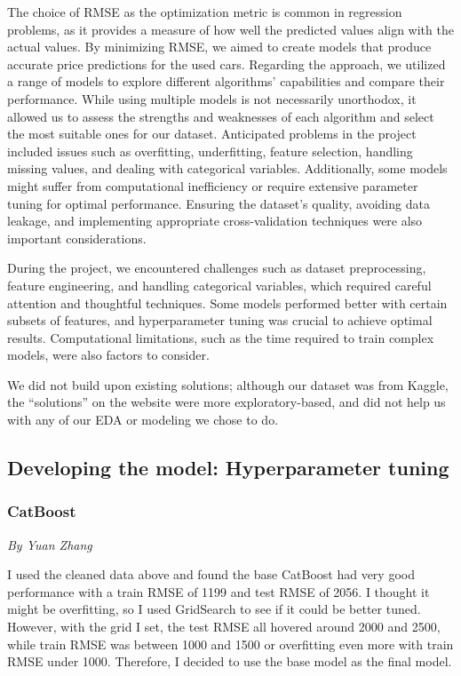 \documentclass[
  letterpaper,
  DIV=11,
  numbers=noendperiod]{scrartcl}
\begin{document}
The choice of RMSE as the optimization metric is common in regression
problems, as it provides a measure of how well the predicted values
align with the actual values. By minimizing RMSE, we aimed to create
models that produce accurate price predictions for the used cars.
Regarding the approach, we utilized a range of models to explore
different algorithms' capabilities and compare their performance. While
using multiple models is not necessarily unorthodox, it allowed us to
assess the strengths and weaknesses of each algorithm and select the
most suitable ones for our dataset. Anticipated problems in the project
included issues such as overfitting, underfitting, feature selection,
handling missing values, and dealing with categorical variables.
Additionally, some models might suffer from computational inefficiency
or require extensive parameter tuning for optimal performance. Ensuring
the dataset's quality, avoiding data leakage, and implementing
appropriate cross-validation techniques were also important
considerations.

During the project, we encountered challenges such as dataset
preprocessing, feature engineering, and handling categorical variables,
which required careful attention and thoughtful techniques. Some models
performed better with certain subsets of features, and hyperparameter
tuning was crucial to achieve optimal results. Computational
limitations, such as the time required to train complex models, were
also factors to consider.

We did not build upon existing solutions; although our dataset was from
Kaggle, the ``solutions'' on the website were more exploratory-based,
and did not help us with any of our EDA or modeling we chose to do.

\hypertarget{developing-the-model-hyperparameter-tuning}{%
\subsection{Developing the model: Hyperparameter
tuning}\label{developing-the-model-hyperparameter-tuning}}

\hypertarget{catboost}{%
\subsubsection{CatBoost}\label{catboost}}

\emph{By Yuan Zhang}

I used the cleaned data above and found the base CatBoost had very good
performance with a train RMSE of 1199 and test RMSE of 2056. I thought
it might be overfitting, so I used GridSearch to see if it could be
better tuned. However, with the grid I set, the test RMSE all hovered
around 2000 and 2500, while train RMSE was between 1000 and 1500 or
overfitting even more with train RMSE under 1000. Therefore, I decided
to use the base model as the final model.
\end{document}
